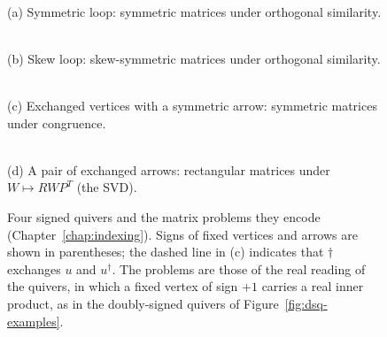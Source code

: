 \documentclass[12pt, a4paper]{report}
\theoremstyle{plain}
\theoremstyle{definition}
\theoremstyle{remark}
\theoremstyle{plain}
\begin{document}
\begin{figure}[ht]
\centering
\begin{minipage}{0.45\linewidth}\centering
{}\\[1mm]
{\small (a) Symmetric loop: symmetric matrices under orthogonal similarity.}
\end{minipage}\hfill
\begin{minipage}{0.45\linewidth}\centering
{}\\[1mm]
{\small (b) Skew loop: skew-symmetric matrices under orthogonal similarity.}
\end{minipage}

\vspace{5mm}
\begin{minipage}{0.45\linewidth}\centering
{}\\[1mm]
{\small (c) Exchanged vertices with a symmetric arrow: symmetric matrices under congruence.}
\end{minipage}\hfill
\begin{minipage}{0.45\linewidth}\centering
{}\\[1mm]
{\small (d) A pair of exchanged arrows: rectangular matrices under $W\mapsto RWP^T$ (the SVD).}
\end{minipage}
\caption{Four signed quivers and the matrix problems they encode (Chapter~\ref{chap:indexing}). Signs of fixed vertices and arrows are shown in parentheses; the dashed line in (c) indicates that $\dagger$ exchanges $u$ and $u^\dagger$. The problems are those of the real reading of the quivers, in which a fixed vertex of sign $+1$ carries a real inner product, as in the doubly-signed quivers of Figure~\ref{fig:dsq-examples}.}
\label{fig:signed-quiver-example}
\end{figure}
\end{document}
